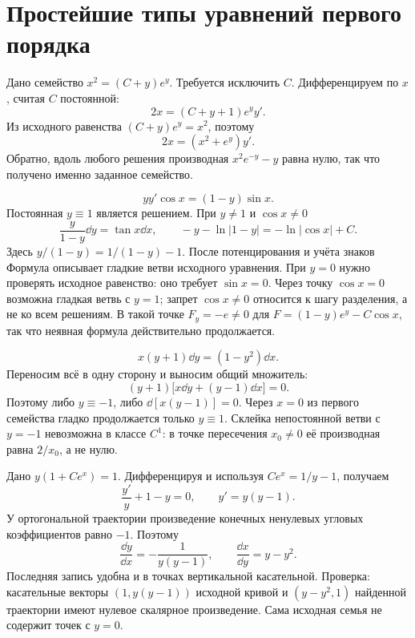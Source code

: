 \section{Простейшие типы уравнений первого порядка}

Дано семейство $x^2=(C+y)e^y$. Требуется исключить $C$.
Дифференцируем по $x$, считая $C$ постоянной:
\[
 2x=(C+y+1)e^y y'.
\]
Из исходного равенства $(C+y)e^y=x^2$, поэтому
\[
 2x=(x^2+e^y)y'.
\]
Обратно, вдоль любого решения производная $x^2e^{-y}-y$ равна нулю,
так что получено именно заданное семейство.

\[
 yy'\cos x=(1-y)\sin x.
\]
Постоянная $y\equiv1$ является решением. При $y\ne1$ и $\cos x\ne0$
\[
 \frac{y}{1-y}\dd y=\tan x\dd x,
 \qquad -y-\ln|1-y|=-\ln|\cos x|+C.
\]
Здесь $y/(1-y)=1/(1-y)-1$. После потенцирования и учёта знаков
Формула описывает гладкие ветви исходного уравнения. При $y=0$ нужно
проверять исходное равенство: оно требует $\sin x=0$. Через точку
$\cos x=0$ возможна гладкая ветвь с $y=1$; запрет $\cos x\ne0$ относится
к шагу разделения, а не ко всем решениям. В такой точке $F_y=-e\ne0$
для $F=(1-y)e^y-C\cos x$, так что неявная формула действительно продолжается.

\[
 x(y+1)\dd y=(1-y^2)\dd x.
\]
Переносим всё в одну сторону и выносим общий множитель:
\[
 (y+1)\bigl[x\dd y+(y-1)\dd x\bigr]=0.
\]
Поэтому либо $y\equiv-1$, либо $\dd[x(y-1)]=0$.
Через $x=0$ из первого семейства гладко продолжается только $y\equiv1$.
Склейка непостоянной ветви с $y=-1$ невозможна в классе $C^1$:
в точке пересечения $x_0\ne0$ её производная равна $2/x_0$, а не нулю.

Дано $y(1+Ce^x)=1$. Дифференцируя и используя $Ce^x=1/y-1$, получаем
\[
 \frac{y'}y+1-y=0,\qquad y'=y(y-1).
\]
У ортогональной траектории произведение конечных ненулевых угловых
коэффициентов равно $-1$. Поэтому
\[
 \frac{\dd y}{\dd x}=-\frac1{y(y-1)},
 \qquad \frac{\dd x}{\dd y}=y-y^2.
\]
Последняя запись удобна и в точках вертикальной касательной.
Проверка: касательные векторы $(1,y(y-1))$ исходной кривой
и $(y-y^2,1)$ найденной траектории имеют нулевое скалярное произведение.
Сама исходная семья не содержит точек с $y=0$.

